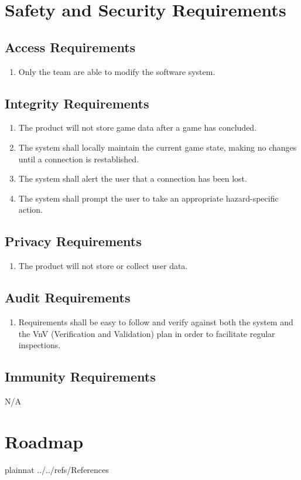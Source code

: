 \documentclass{article}
\begin{document}
\section{Safety and Security Requirements}

\subsection{Access Requirements}
\begin{enumerate}[{SR}1., leftmargin=2\parindent]
    \item Only the \progname{} team are able to modify the software system.
\end{enumerate}

\subsection{Integrity Requirements}
\begin{enumerate}[{SR}1., leftmargin=2\parindent, resume]
    \item The product will not store game data after a game has concluded.
    \item The system shall locally maintain the current game state, making no changes until a connection is restablished.
    \item The system shall alert the user that a connection has been lost.
    \item The system shall prompt the user to take an appropriate hazard-specific action.
\end{enumerate}

\subsection{Privacy Requirements}
\begin{enumerate}[{SR}1., leftmargin=2\parindent, resume]
    \item The product will not store or collect user data.
\end{enumerate}

\subsection{Audit Requirements}
\begin{enumerate}[{SR}1., leftmargin=2\parindent, resume]
    \item Requirements shall be easy to follow and verify against both the system and the VnV (Verification and Validation) plan in order to facilitate regular inspections.
\end{enumerate}

\subsection{Immunity Requirements}
N/A

\section{Roadmap}

\newpage

 {plainnat}
 {../../refs/References}
\end{document}
